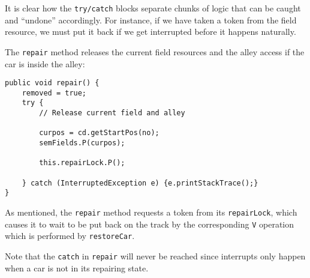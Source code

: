 It is clear how the \texttt{try/catch} blocks separate chunks of logic that can be caught and ``undone'' accordingly. For instance, if we have taken a token from the field resource, we must put it back if we get interrupted before it happens naturally.

The \texttt{repair} method releases the current field resources and the alley access if the car is inside the alley:

\begin{lstlisting}
public void repair() {
	removed = true;
	try {
		// Release current field and alley

		curpos = cd.getStartPos(no);
		semFields.P(curpos);

		this.repairLock.P();

	} catch (InterruptedException e) {e.printStackTrace();}
}
\end{lstlisting}

As mentioned, the \texttt{repair} method requests a token from its \texttt{repairLock}, which causes it to wait to be put back on the track by the corresponding \texttt{V} operation which is performed by \texttt{restoreCar}.

Note that the \texttt{catch} in \texttt{repair} will never be reached since interrupts only happen when a car is not in its repairing state.

